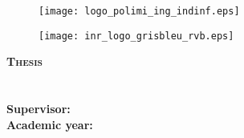 

\AddToShipoutPicture{\BackgroundPic}
\begin{figure}
    \begin{minipage}{0.4\textwidth}
    \hspace{-0.6cm}\texttt{[image: logo\_polimi\_ing\_indinf.eps]}
    \end{minipage}
    \begin{minipage}{0.5\textwidth}
        \texttt{[image: inr\_logo\_grisbleu\_rvb.eps]}
    \end{minipage}
\end{figure}

\vspace{-1mm}

\fontsize{0.3cm}{0.5cm}\selectfont \bfseries \textsc{\color{bluePoli} Thesis}\\

\vspace{-0.2cm}
\Large{\textbf{\color{bluePoli}{\title}}}\\

\vspace{-0.2cm}
\fontsize{0.3cm}{0.5cm}\selectfont \bfseries \textsc{\color{bluePoli} \course}\\



\vspace{-0.4cm}
\fontsize{0.3cm}{0.5cm}\selectfont \bfseries Supervisor: \textsc{\textbf{\advisor}}\\


\vspace{-0.4cm}
\fontsize{0.3cm}{0.5cm}\selectfont \bfseries Academic year: \textsc{\textbf{\YEAR}}

\small \normalfont

\vspace{11pt}

